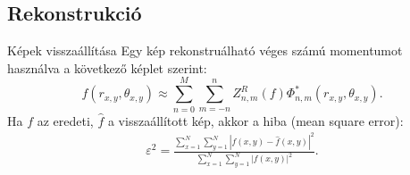 \documentclass{beamer}
\begin{document}

\subsection{Rekonstrukció}
\begin{frame}{Képek visszaállítása}
\vskip 10mm
Egy kép rekonstruálható véges számú momentumot használva a következő képlet szerint:
$$
f(r_{x,y},\theta_{x,y}) \approx \sum_{n=0}^{M}\sum_{m=-n}^{n}Z_{n,m}^R(f)\Phi_{n,m}^*(r_{x,y},\theta_{x,y}).
$$
Ha $f$ az eredeti, $\widehat{f}$ a visszaállított kép, akkor a hiba (mean square error):
\begin{gather*}
    \varepsilon^2 = \frac{\displaystyle \sum_{x=1}^N\sum_{y=1}^N \left|f(x,y) - \widehat{f}(x,y)\right|^2}{\displaystyle \sum_{x=1}^N\sum_{y=1}^N \left|f(x,y)\right|^2}.
\end{gather*}
\end{frame}
\end{document}
